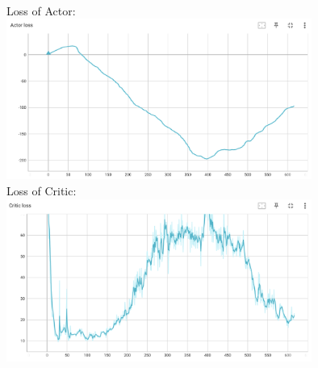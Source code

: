 \documentclass{article} %
\begin{document}
    \\
    Loss of Actor: \\
    \includegraphics[width=10cm]{./imgs/lunarlander/actor_loss.png} \\
    Loss of Critic: \\
    \includegraphics[width=10cm]{./imgs/lunarlander/critic_loss.png} \\
    
\end{document}
